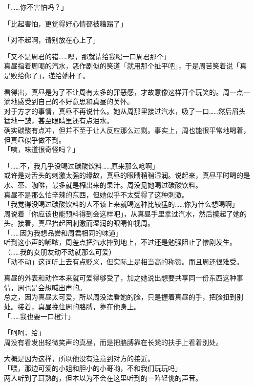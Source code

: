 「……你不害怕吗？」

「比起害怕，更觉得好心情都被糟蹋了」

「对不起啊，请别放在心上了」

「又不是周君的错……嗯，那就请给我喝一口周君那个」\\

真昼指着周喝的汽水，恶作剧似的笑道「就用那个扯平吧」，于是周苦笑着说「真是败给你了」，递给她杯子。

看得出，真昼是为了不让周有太多的罪恶感，才故意像这样开个玩笑的。周一点一滴地感受到自己的不好意思和真昼的关怀。\\

对于方才的事情，真昼不再说什么。她从周那里接过汽水，吸了一口……然后眉头猛地一皱，甚至眼睛里还有点泪水。\\

确实碳酸有点冲，但并不至于让人反应那么过剩。事实上，周也能很平常地喝着，但真昼似乎做不到。\\

「咦，味道很奇怪吗？」

「……不，我几乎没喝过碳酸饮料……原来那么呛啊」\\

或许是对舌头的刺激太强的缘故，真昼的眼睛稍稍湿润。说起来，真昼平时喝的是水、茶、咖啡，最多就是榨出来的果汁。周没见她喝过碳酸饮料。\\

真昼不是那么怕辛辣的东西，但她似乎不太受得了这种刺激。\\

「我觉得没喝过碳酸饮料的人不该上来就喝这种比较猛的……你为什么想喝啊」\\

周说着「你应该也能预料得到会这样吧」，从真昼手里拿过汽水，然后摸起了她的头。接着，真昼抬起因刺激而湿润的眼睛仰视周。\\

「……因为我想品尝和周君相同的味道」\\

听到这小声的嘟哝，周差点把汽水摔到地上，不过还是勉强阻止了惨剧发生。\\

（……我的女朋友动不动就那么可爱）\\

「动不动」这词听上去有点贬义，但实际上是相当高的称赞。而且周还很难受。

真昼的外表和动作本来就可爱得够受了，加之她说出想要共享同一份东西这种事情，周也是会想喊出声的。\\

总之，因为真昼太可爱，所以周没法看她的脸，只是握着真昼的手，把脸扭到别处。接着，真昼挽住周的胳膊，靠在他身上。\\

「……我也要一口橙汁」

「呵呵，给」\\

周没有看发出轻微笑声的真昼，而是把胳膊靠在长凳的扶手上看着别处。

大概是因为这样，所以他没有注意到对方的接近。\\

「喂，那边可爱的小姐和胆小的小哥哟，不和我们玩玩吗」\\

两人听到了耳熟的，但本以为不会在这里听到的一阵轻佻的声音。
